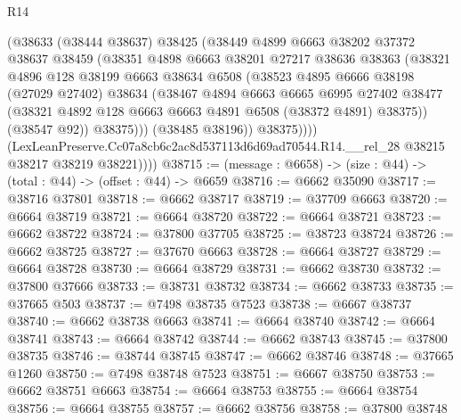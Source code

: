 \begin{lexlean}{R14}
\begin{coremodule}
                  (@38633
                    (@38444 @38637)
                    @38425
                    (@38449
                      @4899
                      @6663
                      @38202
                      @37372
                      @38637
                      @38459
                      (@38351
                        @4898
                        @6663
                        @38201
                        @27217
                        @38636
                        @38363
                        (@38321
                          @4896
                          @128
                          @38199
                          @6663
                          @38634
                          @6508
                          (@38523
                            @4895
                            @6666
                            @38198
                            (@27029 @27402)
                            @38634
                            (@38467
                              @4894
                              @6663
                              @6665
                              @6995
                              @27402
                              @38477
                              (@38321 @4892 @128 @6663 @6663 @4891 @6508 (@38372 @4891) @38375))
                            (@38547 @92))
                          @38375)))
                    (@38485 @38196))
                  @38375))))
          (LexLeanPreserve.Cc07a8cb6c2ac8d537113d6d69ad70544.R14.__rel_28
            @38215
            @38217
            @38219
            @38221))))
@38715 := (message : @6658) -> (size : @44) -> (total : @44) -> (offset : @44) -> @6659
@38716 := @6662 @35090
@38717 := @38716 @37801
@38718 := @6662 @38717
@38719 := @37709 @6663
@38720 := @6664 @38719
@38721 := @6664 @38720
@38722 := @6664 @38721
@38723 := @6662 @38722
@38724 := @37800 @37705
@38725 := @38723 @38724
@38726 := @6662 @38725
@38727 := @37670 @6663
@38728 := @6664 @38727
@38729 := @6664 @38728
@38730 := @6664 @38729
@38731 := @6662 @38730
@38732 := @37800 @37666
@38733 := @38731 @38732
@38734 := @6662 @38733
@38735 := @37665 @503
@38737 := @7498 @38735 @7523
@38738 := @6667 @38737
@38740 := @6662 @38738 @6663
@38741 := @6664 @38740
@38742 := @6664 @38741
@38743 := @6664 @38742
@38744 := @6662 @38743
@38745 := @37800 @38735
@38746 := @38744 @38745
@38747 := @6662 @38746
@38748 := @37665 @1260
@38750 := @7498 @38748 @7523
@38751 := @6667 @38750
@38753 := @6662 @38751 @6663
@38754 := @6664 @38753
@38755 := @6664 @38754
@38756 := @6664 @38755
@38757 := @6662 @38756
@38758 := @37800 @38748

\end{coremodule}
\end{lexlean}

